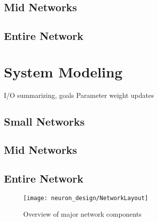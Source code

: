 \subsection{Mid Networks}


\subsection{Entire Network}


\section{System Modeling}

I/O summarizing, goals
Parameter weight updates

\subsection{Small Networks}


\subsection{Mid Networks}


\subsection{Entire Network}



\begin{figure}[h!]
\centering
\texttt{[image: neuron\_design/NetworkLayout]}
\caption{Overview of major network components}
\label{fig:NetworkLayout}
\end{figure}
